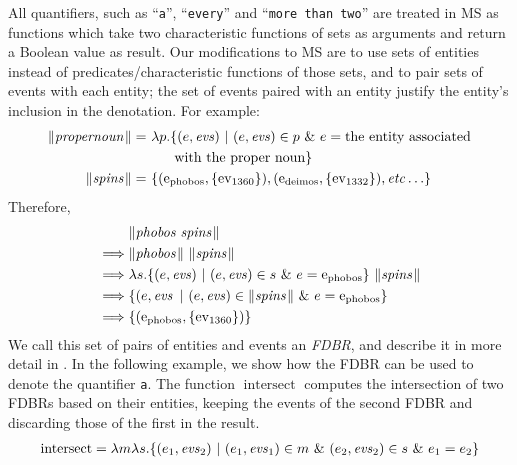 \documentclass[../main.tex]{subfiles}
\begin{document}
\begin{refsection}
All quantifiers, such as ``\texttt{a}'', ``\texttt{every}'' and ``\texttt{more than two}'' are treated in MS as functions which take two characteristic functions of sets as arguments and return a Boolean value as result. Our modifications to MS are to use sets of entities instead of predicates/characteristic functions of those sets, and to pair sets of events with each entity; the set of events paired with an entity justify the entity’s inclusion in the denotation. For example:
\begin{equation*}
	\begin{split}
		\meaningof{propernoun} =&\ \lambda p.
		\{(e, \evs)\ |\ (e, \evs) \in p\ \&\ e = \dmathrm{the\ entity\ associated} \\ & \qquad \dmathrm{with\ the\ proper\ noun}\} \\
		\meaningof{spins} =&\ \{(\entityassoc{phobos}, \{\eventassoc{1360}\}), (\entityassoc{deimos}, \{\eventassoc{1332}\}), \etc\}
	\end{split}
\end{equation*}
Therefore,
\begin{equation*}
	\begin{split}
		& \meaningof{phobos spins} \\
		\implies& \meaningof{phobos}\ \meaningof{spins} \\
		\implies& \lambda s.\{(e, \evs)\ |\ (e, \evs) \in s\ \&\ e = \entityassoc{phobos}\}\ \meaningof{spins} \\
		\implies& \{(e, \evs\ |\ (e, \evs) \in \meaningof{spins}\ \&\ e = \entityassoc{phobos}\}\ \\
		\implies& \{(\entityassoc{phobos}, \{\eventassoc{1360}\})\}
	\end{split}
\end{equation*}
We call this set of pairs of entities and events an \textit{FDBR}, and describe it in more detail in .
In the following example, we show how the FDBR can be used to denote the quantifier \texttt{a}.  The function $\operatorname{intersect}$ computes the intersection of two FDBRs based on their entities, keeping the events of the second FDBR and discarding those of the first in the result.
\begin{equation*}
	\begin{split}
		\operatorname{intersect} &= \lambda m \lambda s.\{(e_1,\evs_2)\ |\ (e_1,\evs_1) \in m\ \&\ (e_2,\evs_2) \in s\ \&\ e_1 = e_2\} \\

\end{split}
\end{equation*}
\end{refsection}
\end{document}
